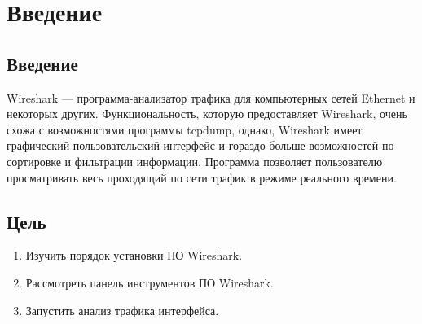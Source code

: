 \chapter{Введение}
\label{ch:intro}

\section{Введение}

Wireshark — программа-анализатор трафика для компьютерных сетей Ethernet и некоторых других. Функциональность, которую предоставляет Wireshark, очень схожа с возможностями программы tcpdump, однако, Wireshark имеет графический пользовательский интерфейс и гораздо больше возможностей по сортировке и фильтрации информации.
Программа позволяет пользователю просматривать весь проходящий по сети трафик в режиме реального времени.


\section{Цель}  

\begin{enumerate}
    \item Изучить порядок установки ПО Wireshark.
    \item Рассмотреть панель инструментов ПО Wireshark.
    \item Запустить анализ трафика интерфейса.
\end{enumerate}

\endinput